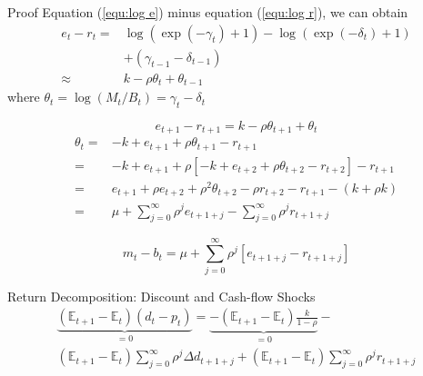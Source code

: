 \documentclass{beamer}
\begin{document}
\begin{frame}[allowframebreaks]{Proof}
\pagebreak
Equation (\textcolor{blue}{\ref{equ:log e}}) minus equation (\textcolor{blue}{\ref{equ:log r}}), we can obtain
\begin{equation}
	\begin{aligned}
			e_{t}-r_{t}=&\log \left(\exp \left(-\gamma_{t}\right)+1\right)-\log \left(\exp \left(-\delta_{t}\right)+1\right) \\
			&+\left(\gamma_{t-1}-\delta_{t-1}\right) \\
			\approx & k-\rho \theta_{t}+\theta_{t-1}
	\end{aligned}
\end{equation}
where $\theta_{t}=\log \left(M_{t} / B_{t}\right)  = \gamma_t - \delta_t $

\pagebreak
\begin{equation}
	e_{t+1}-r_{t+1}= k -\rho \theta_{t+1}+\theta_t
\end{equation}
\begin{equation}
	\begin{aligned}
		\theta_t= & - k +  e_{t+1}+\rho \theta_{t+1}-r_{t+1} \\
		 =&- k + e_{t+1}+\rho\left[- k + e_{t+2}+\rho \theta_{t+2}-r_{t+2}\right]-r_{t+1} \\
		 =& e_{t+1}+\rho e_{t+2}+\rho^2 \theta_{t+2}-\rho r_{t+2}-r_{t+1} -(k + \rho k) \\
		 =& \mu+ \sum_{j=0}^{\infty} \rho^j e_{t+1+j}-\sum_{j=0}^{\infty} \rho^j r_{t+1+j}
		\end{aligned}
\end{equation}

\begin{equation*}
m_t - b_t =\mu+ \sum_{j=0}^{\infty} \rho^j \left[ e_{t+1+j} - r_{t+1+j}\right]
\end{equation*}
\end{frame}


\begin{frame}{Return Decomposition: Discount and Cash-flow Shocks}
\begin{equation}
    \begin{aligned}
        \underbrace{\left(\mathbb{E}_{t+1}-\mathbb{E}_t\right)\left(d_t-p_t\right)}_{=0}=\underbrace{-\left(\mathbb{E}_{t+1}-\mathbb{E}_t\right) \frac{k}{1-\rho}}_{=0}- \\
        \left(\mathbb{E}_{t+1}-\mathbb{E}_t\right) \sum_{j=0}^{\infty} \rho^j \Delta d_{t+1+j}+\left(\mathbb{E}_{t+1}-\mathbb{E}_t\right) \sum_{j=0}^{\infty} \rho^j r_{t+1+j} 
    \end{aligned}
\end{equation}
\end{frame}
\end{document}
